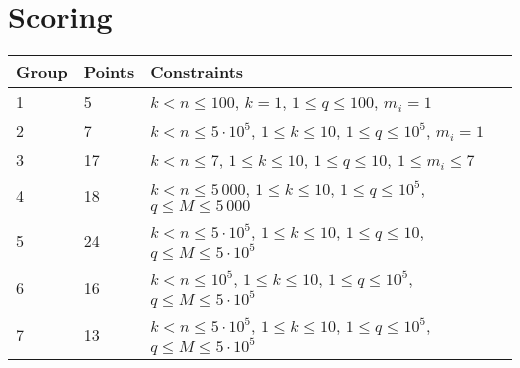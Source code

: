 \section*{Scoring}
\begin{tabular}{|l|l|l|}
    \hline
    Group & Points & Constraints \\ \hline
    1     & 5      & $k < n \leq 100$,           $k = 1$,            $1 \leq q \leq 100$,  $m_i = 1$ \\ \hline %
    2     & 7      & $k < n \leq 5 \cdot 10^5$,  $1 \leq k \leq 10$, $1 \leq q \leq 10^5$, $m_i = 1$ \\ \hline %
    3     & 17     & $k < n \leq 7$,             $1 \leq k \leq 10$, $1 \leq q \leq 10$,   $1 \leq m_i \leq 7$  \\ \hline %
    4     & 18     & $k < n \leq 5\,000$,        $1 \leq k \leq 10$, $1 \leq q \leq 10^5$, $q \leq M \leq 5\,000$ \\ \hline %
    5     & 24     & $k < n \leq 5 \cdot 10^5$,  $1 \leq k \leq 10$, $1 \leq q \leq 10$,   $q \leq M \leq 5 \cdot 10^5$ \\ \hline %
    6     & 16     & $k < n \leq 10^5$,          $1 \leq k \leq 10$, $1 \leq q \leq 10^5$, $q \leq M \leq 5 \cdot 10^5$ \\ \hline %
    7     & 13     & $k < n \leq 5 \cdot 10^5$,  $1 \leq k \leq 10$, $1 \leq q \leq 10^5$, $q \leq M \leq 5 \cdot 10^5$ \\ \hline %
\end{tabular}

